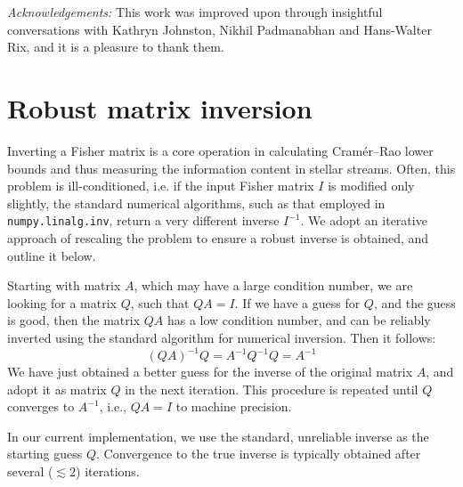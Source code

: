 \documentclass[modern]{aastex61}
\begin{document}
\emph{Acknowledgements:} This work was improved upon through insightful conversations with Kathryn Johnston, Nikhil Padmanabhan and Hans-Walter Rix, and it is a pleasure to thank them.




\appendix
\section{Robust matrix inversion}
Inverting a Fisher matrix is a core operation in calculating Cram\' er--Rao lower bounds and thus measuring the information content in stellar streams. 
Often, this problem is ill-conditioned, i.e. if the input Fisher matrix $I$ is modified only slightly, the standard numerical algorithms, such as that employed in \texttt{numpy.linalg.inv}, return a very different inverse $I^{-1}$.
We adopt an iterative approach of rescaling the problem to ensure a robust inverse is obtained, and outline it below.

Starting with matrix $A$, which may have a large condition number, we are looking for a matrix $Q$, such that $Q A = I$.
If we have a guess for $Q$, and the guess is good, then the matrix $QA$ has a low condition number, and can be reliably inverted using the standard algorithm for numerical inversion.
Then it follows:
\begin{equation*}
(QA)^{-1} Q = A^{-1} Q^{-1} Q = A^{-1}
\end{equation*}
We have just obtained a better guess for the inverse of the original matrix $A$, and adopt it as matrix $Q$ in the next iteration.
This procedure is repeated until $Q$ converges to $A^{-1}$, i.e., $Q A = I$ to machine precision.

In our current implementation, we use the standard, unreliable inverse as the starting guess $Q$. 
Convergence to the true inverse is typically obtained after several ($\lesssim2$) iterations.
\end{document}
